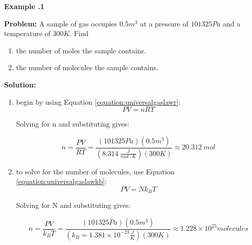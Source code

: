 \begin{mdframed}[backgroundcolor=blue!10!white]
	\begin{center}
		
		
		\textbf{Example \thesection.1}	
	\end{center}
	
	\textbf{Problem: } A sample of gas occupies $0.5 \si{m^3}$ at a pressure of $101325 \si{Pa}$ and a temperature of $300 \si{K}$.  Find
	\begin{enumerate}[label=(\alph*)]
		\item the number of moles the sample contains.
		\item the number of molecules the sample contains.
	\end{enumerate}
	
	
	\vspace{0.1in}
	
	\textbf{Solution:} 

	
	\begin{enumerate}[label=(\alph*)]
	
		\item begin by using Equation \ref{equation:universalgaslawr}:
		\begin{equation*}
			PV = nRT
		\end{equation*}
		
		Solving for n and substituting gives: 
		
		\begin{equation*}
			n= \frac{PV}{RT} = \frac{(101325 \si{Pa})(0.5 \si{m^3})}{(\SI{8.314}{\frac{J}{mol\cdot K}})(300 \si{K})} \approx \boxed{\SI{20.312}{mol}}
		\end{equation*}
		
		\item to solve for the number of molecules, use Equation \ref{equation:universalgaslawkb}:
		\begin{equation*}
			PV = N k_BT
		\end{equation*}
		
		Solving for N and substituting gives: 
		
			\begin{equation*}
			n= \frac{PV}{k_BT} = \frac{(101325 \si{Pa})(0.5 \si{m^3})}{(	k_B = 1.381 \times 10^{-23}\si{\frac{J}{K}})(300 \si{K})} \approx \boxed{1.228 \times 10^{25} \si{molecules}}
		\end{equation*}
		
	\end{enumerate}

\end{mdframed}	
	
